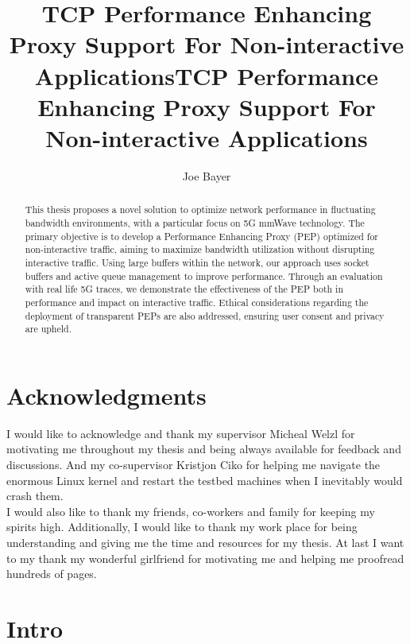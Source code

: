\documentclass[a4paper,english, 12pt]{report}
\author{Joe Bayer}
\title{TCP Performance Enhancing Proxy Support For Non-interactive Applications}
\title{TCP Performance Enhancing Proxy Support For Non-interactive Applications}
\begin{document}
\uiomasterfp[program={Informatics: Programming and System Architecture}, supervisors={Michael Welzl\and Kristjon Ciko}]
\tableofcontents


\listoffigures
{}

\begin{abstract}
This thesis proposes a novel solution to optimize network performance in fluctuating bandwidth environments, with a particular focus on 5G mmWave technology. The primary objective is to develop a Performance Enhancing Proxy (PEP) optimized for non-interactive traffic, aiming to maximize bandwidth utilization without disrupting interactive traffic. Using large buffers within the network, our approach uses socket buffers and active queue management to improve performance. Through an evaluation with real life 5G traces, we demonstrate the effectiveness of the PEP both in performance and impact on interactive traffic. Ethical considerations regarding the deployment of transparent PEPs are also addressed, ensuring user consent and privacy are upheld.
\end{abstract}

\chapter*{Acknowledgments}
I would like to acknowledge and thank my supervisor Micheal Welzl for motivating me throughout my thesis and being always available for feedback and discussions. And my co-supervisor Kristjon Ciko for helping me navigate the enormous Linux kernel and restart the testbed machines when I inevitably would crash them.\\

I would also like to thank my friends, co-workers and family for keeping my spirits high. Additionally, I would like to thank my work place for being understanding and giving me the time and resources for my thesis. At last I want to my thank my wonderful girlfriend for motivating me and helping me proofread hundreds of pages.

\chapter{Intro}
\end{document}
